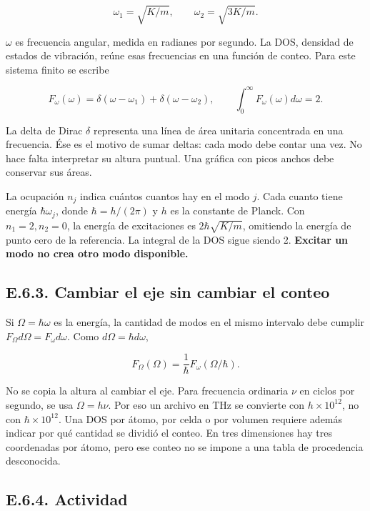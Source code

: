 \documentclass[
  spanish,
  10pt,
  a4paper,
]{article}
\begin{document}
\[
\omega_1=\sqrt{K/m},\qquad \omega_2=\sqrt{3K/m}.
\tag{E.14}
\]

\(\omega\) es frecuencia angular, medida en radianes por segundo. La
DOS, densidad de estados de vibración, reúne esas frecuencias en una
función de conteo. Para este sistema finito se escribe

\[
F_\omega(\omega)=\delta(\omega-\omega_1)+\delta(\omega-\omega_2),
\qquad \int_0^\infty F_\omega(\omega)d\omega=2.
\tag{E.15}
\]

La delta de Dirac \(\delta\) representa una línea de área unitaria
concentrada en una frecuencia. Ése es el motivo de sumar deltas: cada
modo debe contar una vez. No hace falta interpretar su altura puntual.
Una gráfica con picos anchos debe conservar sus áreas.

La ocupación \(n_j\) indica cuántos cuantos hay en el modo \(j\). Cada
cuanto tiene energía \(\hbar\omega_j\), donde \(\hbar=h/(2\pi)\) y \(h\)
es la constante de Planck. Con \(n_1=2,n_2=0\), la energía de
excitaciones es \(2\hbar\sqrt{K/m}\), omitiendo la energía de punto cero
de la referencia. La integral de la DOS sigue siendo 2. \textbf{Excitar
un modo no crea otro modo disponible.}

\subsection{E.6.3. Cambiar el eje sin cambiar el
conteo}\label{e.6.3.-cambiar-el-eje-sin-cambiar-el-conteo}

Si \(\Omega=\hbar\omega\) es la energía, la cantidad de modos en el
mismo intervalo debe cumplir \(F_\Omega d\Omega=F_\omega d\omega\). Como
\(d\Omega=\hbar d\omega\),

\[
F_\Omega(\Omega)=\frac1\hbar F_\omega(\Omega/\hbar).
\tag{E.16}
\]

No se copia la altura al cambiar el eje. Para frecuencia ordinaria
\(\nu\) en ciclos por segundo, se usa \(\Omega=h\nu\). Por eso un
archivo en THz se convierte con \(h\times10^{12}\), no con
\(\hbar\times10^{12}\). Una DOS por átomo, por celda o por volumen
requiere además indicar por qué cantidad se dividió el conteo. En tres
dimensiones hay tres coordenadas por átomo, pero ese conteo no se impone
a una tabla de procedencia desconocida.

\subsection{E.6.4. Actividad}\label{e.6.4.-actividad}
\end{document}

